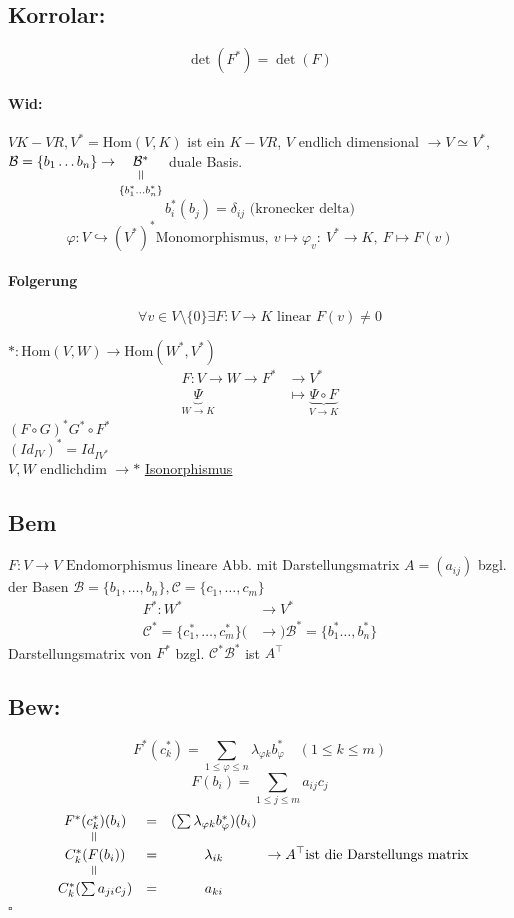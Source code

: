 \documentclass[titlepage,12pt,a4paper,ngerman]{report}
\newenvironment{bew}[1]{\subsection{Bew: #1}}{\hfill$\square$}
\newcommand{\Bew}[2]{\begin{bew}{#1}#2\end{bew}}
\newcommand{\verteq}{\rotatebox{90}{$\,=$}}
\newcommand{\equalto}[2]{\underset{\scriptstyle\overset{\mkern4mu\verteq}{#2}}{#1}}
\newcommand{\tx}[1]{\textrm{#1}}
\newcommand{\ub}[1]{\underbrace{#1}}
\newcommand{\enph}{F: V \to V \textrm{ Endomorphismus}}
\begin{document}
\subsection{Korrolar:}
$$ \det(F^*) = \det(F) $$


\paragraph{Wid:}
$V K-VR, V^* = \tx{Hom} (V,K)$ ist ein $K-VR$, $V$ endlich dimensional $\rightarrow V \simeq V^*$, $\mathcal B = \{b_1 \dots b_n\} \rightarrow \equalto{\mathcal{B}^*}{\{b_1^* \dots b_n^*\}}$ duale Basis.
$$b_i^* (b_j) = \delta_{ij} \tx{ (kronecker delta)}$$
$$\varphi: V \hookrightarrow (V^*)^* \tx{Monomorphismus},\ v \mapsto \varphi_v:\ V^* \to K,\ F \mapsto F(v)$$ 
\paragraph{Folgerung}
$$\forall v \in V \setminus \{0\} \exists F: V \to K \tx{ linear } F(v) \neq 0$$

$ * : \tx{Hom}(V,W) \to \tx{Hom}(W^*,V^*) $\\
\begin{align*}
F: V \to W \rightarrow F^* &\to V^* \\
\ub{\Psi}_{W \to K} &\mapsto \ub{ \Psi \circ F}_{ V \to K} 
\end{align*}
$ (F\circ G)^* G^* \circ F^* $\\
$ (Id_{IV})^* = Id_{IV^*} $\\
$ V,W $ endlichdim $ \rightarrow * $ \underline{\underline{Isonorphismus}} 

\subsection*{Bem}
$ \enph $ lineare Abb. mit Darstellungsmatrix $ A = (a_{ij}) $ bzgl. der Basen $ \mathcal{B} = \{b_1,\dots ,b_n\} , \mathcal{C}= \{c_1,\dots,c_m\} $\\

\begin{align*}
F^*: W^* &\to V^* \\
\mathcal{C}^* = \{ c^*_1,\dots , c^*_m\} (&\rightarrow) \mathcal{B}^* = \{b^*_1  \dots , b^*_n\} 
\end{align*} 
Darstellungsmatrix von $ F^* $ bzgl. $ \mathcal{C}^* \mathcal{B}^* $ ist $ A^\top $

\Bew{}{
	$$F^* (c_k^*) = \sum _{1\leq \varphi \leq n} \lambda_{\varphi k}b_\varphi^* \quad (1\leq k \leq m)$$
	$$F(b_i) = \sum _{1\leq j \leq m} a_{ij} c_j$$
	$$ \begin{array}{ccc}
	F^* (c_k^*) (b_i) & = &(\sum \lambda_{\varphi k} b_\varphi^*) (b_i)\\
	\rotatebox{90}{=} & &  \\
	C_k^* (F(b_i)) & = & \lambda_{ik}\\
	\rotatebox{90}{=} & & \\
	C_k^*(\sum a_{ji}c_j) & = & a_{ki}
	\end{array} \rightarrow A^\top \tx{ist die Darstellungs matrix}$$
}
\end{document}
